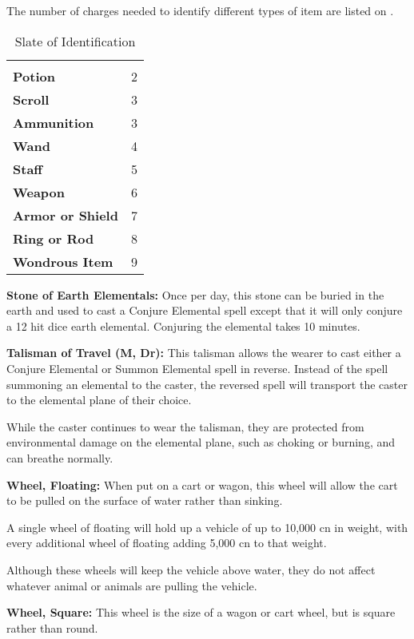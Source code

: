 \begin{multicols*}{2}
The number of charges needed to identify different types of item are listed on .

\begin {table}[H]
  \caption{Slate of Identification}\label{tab:Slate of Identification}
  \begin{tabularx}{\columnwidth}{>{\bfseries}YY}
	 & \\
	Potion & 2\\
	Scroll & 3\\
	Ammunition & 3\\
	Wand & 4\\
	Staff & 5\\
	Weapon & 6\\
	Armor or Shield & 7\\
	Ring or Rod & 8\\
	Wondrous Item & 9
  \end {tabularx}
\end {table}

\textbf{Stone of Earth Elementals:} Once per day, this stone can be buried in the earth and used to cast a Conjure Elemental spell except that it will only conjure a 12 hit dice earth elemental. Conjuring the elemental takes 10 minutes.

\textbf{Talisman of Travel (M, Dr):} This talisman allows the wearer to cast either a Conjure Elemental or Summon Elemental spell in reverse. Instead of the spell summoning an elemental to the caster, the reversed spell will transport the caster to the elemental plane of their choice.

While the caster continues to wear the talisman, they are protected from environmental damage on the elemental plane, such as choking or burning, and can breathe normally.

\textbf{Wheel, Floating:} When put on a cart or wagon, this wheel will allow the cart to be pulled on the surface of water rather than sinking.

A single wheel of floating will hold up a vehicle of up to 10,000 cn in weight, with every additional wheel of floating adding 5,000 cn to that weight.

Although these wheels will keep the vehicle above water, they do not affect whatever animal or animals are pulling the vehicle.

\textbf{Wheel, Square:} This wheel is the size of a wagon or cart wheel, but is square rather than round.


\end{multicols*}
